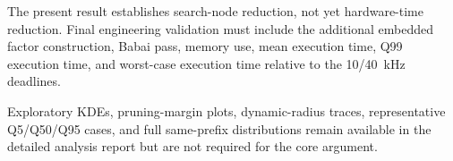 \documentclass[paper=a4,oneside,fontsize=12pt,DIV=14,headings=normal,parskip=half,headsepline,numbers=noendperiod]{scrreprt}
\begin{document}
The present result establishes search-node reduction, not yet hardware-time
reduction.  Final engineering validation must include the additional embedded
factor construction, Babai pass, memory use, mean execution time, Q99 execution
time, and worst-case execution time relative to the 10/40~kHz deadlines.

Exploratory KDEs, pruning-margin plots, dynamic-radius traces, representative
Q5/Q50/Q95 cases, and full same-prefix distributions remain available in the
detailed analysis report but are not required for the core argument.
\end{document}
